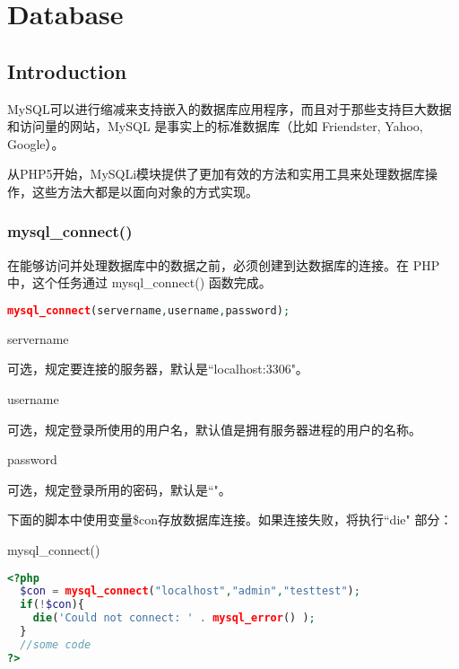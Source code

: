 \part{Database}



\chapter{Introduction}








MySQL可以进行缩减来支持嵌入的数据库应用程序，而且对于那些支持巨大数据和访问量的网站，MySQL 是事实上的标准数据库（比如 Friendster, Yahoo, Google）。

从PHP5开始，MySQLi模块提供了更加有效的方法和实用工具来处理数据库操作，这些方法大都是以面向对象的方式实现。

\section{mysql\_connect()}


在能够访问并处理数据库中的数据之前，必须创建到达数据库的连接。在 PHP 中，这个任务通过 mysql\_connect() 函数完成。


\begin{lstlisting}[language=PHP]
mysql_connect(servername,username,password);
\end{lstlisting}

\begin{compactitem}
\item servername

可选，规定要连接的服务器，默认是``localhost:3306"。
\item username

可选，规定登录所使用的用户名，默认值是拥有服务器进程的用户的名称。
\item password

可选，规定登录所用的密码，默认是``"。
\end{compactitem}

下面的脚本中使用变量\$con存放数据库连接。如果连接失败，将执行``die" 部分：

\begin{example}
mysql\_connect()
\begin{lstlisting}[language=PHP]
<?php
  $con = mysql_connect("localhost","admin","testtest");
  if(!$con){
    die('Could not connect: ' . mysql_error() );
  }
  //some code
?>
\end{lstlisting}
\end{example}

